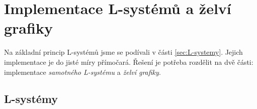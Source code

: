 \section{Implementace L-systémů a želví grafiky}\label{sec:implementace-lsystemu-a-zelvi-grafiky}

Na základní princip L-systémů jsme se podívali v části \ref{sec:L-systemy}. Jejich implementace je do jisté míry přímočará. Řešení je potřeba rozdělit na dvě části: implementace \emph{samotného L-systému} a \emph{želví grafiky}.

\subsection{L-systémy}\label{subsec:implementace-lsystemu}

